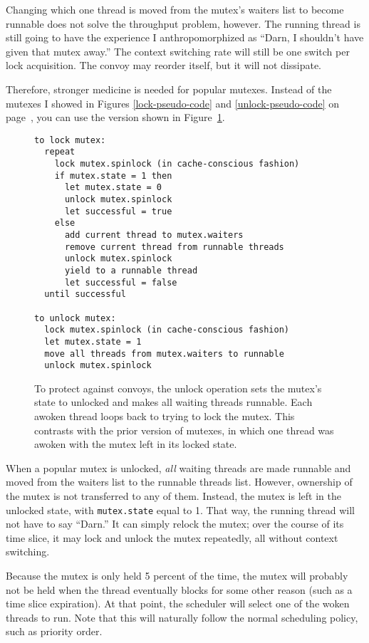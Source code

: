 Changing which one thread is moved from the mutex's waiters list to
become runnable does not solve the throughput problem, however.  The
running thread is still going to have the experience I
anthropomorphized as ``Darn, I shouldn't have given that mutex away.''
The context switching rate will still be one switch per lock
acquisition.  The convoy may reorder itself, but it will not
dissipate.

Therefore, stronger medicine is needed for popular mutexes.  Instead
of the mutexes I showed in Figures \ref{lock-pseudo-code} and
\ref{unlock-pseudo-code} on page~\pageref{lock-pseudo-code}, you can
use the version shown in Figure~\ref{convoy-pseudo-code}.
\begin{figure}
\begin{verbatim}
to lock mutex:
  repeat
    lock mutex.spinlock (in cache-conscious fashion)
    if mutex.state = 1 then
      let mutex.state = 0
      unlock mutex.spinlock
      let successful = true
    else
      add current thread to mutex.waiters
      remove current thread from runnable threads
      unlock mutex.spinlock
      yield to a runnable thread
      let successful = false
  until successful

to unlock mutex:
  lock mutex.spinlock (in cache-conscious fashion)
  let mutex.state = 1
  move all threads from mutex.waiters to runnable
  unlock mutex.spinlock
\end{verbatim}
\caption{To protect against convoys, the unlock operation sets the
  mutex's state to unlocked and makes all waiting threads runnable.
  Each awoken thread loops back to trying to lock the mutex.  This
  contrasts with the prior version of mutexes, in which one thread
  was awoken with the mutex left in its locked state.}
\label{convoy-pseudo-code}
\end{figure}

When a popular mutex is unlocked, {\em all} waiting threads are made
runnable and moved from the waiters list to the runnable threads list.
However, ownership of the mutex is not transferred to any of them.
Instead, the mutex is left in the unlocked state, with \verb|mutex.state| equal to 1.  That way, the
running thread will not have to say ``Darn.''  It can simply relock
the mutex; over the course of its time slice, it may lock and unlock
the mutex repeatedly, all without context switching.

Because the mutex is only held 5 percent of the time, the
mutex will probably not be held when the thread eventually blocks for
some other reason (such as a time slice expiration).  At that point, the
scheduler will select one of the woken threads to run.  Note that this
will naturally follow the normal scheduling policy, such as priority
order.


